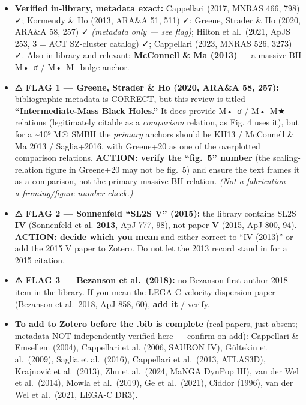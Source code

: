 \documentclass[
]{article}
\providecommand{\tightlist}{%
  \setlength{\itemsep}{0pt}\setlength{\parskip}{0pt}}
\begin{document}
\begin{itemize}
\tightlist
\item
  \textbf{Verified in-library, metadata exact:} Cappellari (2017, MNRAS
  466, 798) ✓; Kormendy \& Ho (2013, ARA\&A 51, 511) ✓; Greene, Strader
  \& Ho (2020, ARA\&A 58, 257) ✓ \emph{(metadata only --- see flag)};
  Hilton et al.~(2021, ApJS 253, 3 = ACT SZ-cluster catalog) ✓;
  Cappellari (2023, MNRAS 526, 3273) ✓. Also in-library and relevant:
  \textbf{McConnell \& Ma (2013)} --- a massive-BH M•--σ / M•--M\_bulge
  anchor.
\item
  \textbf{⚠ FLAG 1 --- Greene, Strader \& Ho (2020, ARA\&A 58, 257):}
  bibliographic metadata is CORRECT, but this review is titled
  \textbf{``Intermediate-Mass Black Holes.''} It does provide M•--σ /
  M•--M★ relations (legitimately citable as a \emph{comparison}
  relation, as Fig. 4 uses it), but for a \textasciitilde10⁹ M☉ SMBH the
  \emph{primary} anchors should be KH13 / McConnell \& Ma 2013 /
  Saglia+2016, with Greene+20 as one of the overplotted comparison
  relations. \textbf{ACTION: verify the ``fig.~5'' number} (the
  scaling-relation figure in Greene+20 may not be fig.~5) and ensure the
  text frames it as a comparison, not the primary massive-BH relation.
  \emph{(Not a fabrication --- a framing/figure-number check.)}
\item
  \textbf{⚠ FLAG 2 --- Sonnenfeld ``SL2S V'' (2015):} the library
  contains SL2S \textbf{IV} (Sonnenfeld et al. \textbf{2013}, ApJ 777,
  98), not paper \textbf{V} (2015, ApJ 800, 94). \textbf{ACTION: decide
  which you mean} and either correct to ``IV (2013)'' or add the 2015 V
  paper to Zotero. Do not let the 2013 record stand in for a 2015
  citation.
\item
  \textbf{⚠ FLAG 3 --- Bezanson et al.~(2018):} no Bezanson-first-author
  2018 item in the library. If you mean the LEGA-C velocity-dispersion
  paper (Bezanson et al.~2018, ApJ 858, 60), \textbf{add it} / verify.
\item
  \textbf{To add to Zotero before the .bib is complete} (real papers,
  just absent; metadata NOT independently verified here --- confirm on
  add): Cappellari \& Emsellem (2004), Cappellari et al. (2006, SAURON
  IV), Gültekin et al.~(2009), Saglia et al.~(2016), Cappellari et
  al.~(2013, ATLAS3D), Krajnović et al.~(2013), Zhu et al.~(2024, MaNGA
  DynPop III), van der Wel et al.~(2014), Mowla et al.~(2019), Ge et
  al.~(2021), Ciddor (1996), van der Wel et al.~(2021, LEGA-C DR3).
\end{itemize}
\end{document}
